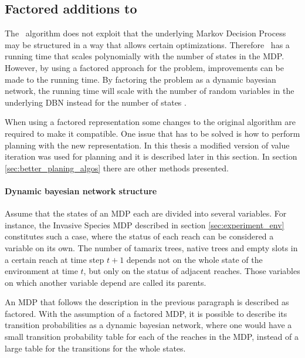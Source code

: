 \subsection{Factored additions to \etre}
\label{sec:factored_e3}

The \etre\ algorithm does not exploit that the underlying Markov Decision
Process may be structured in a way that allows certain optimizations. Therefore
\etre\ has a running time that scales polynomially with the number of states in
the MDP. However, by using a factored approach for the problem, improvements
can be made to the running time. By factoring the problem as a dynamic bayesian
network, the running time will scale with the number of random variables in the
underlying DBN instead for the number of states
\parencite{kearns1999efficient}. 

When using a factored representation some changes to the original algorithm are
required to make it compatible. One issue that has to be solved is how to
perform  planning with the new representation. In this thesis a modified version
of value iteration was used for planning and it is described later in this
section. In section \ref{sec:better_planing_algos} there are other methods
presented.


\paragraph{Dynamic bayesian network structure}

Assume that the states of an MDP each are divided into several variables. For
instance, the Invasive Species MDP described in section
\ref{sec:experiment_env} constitutes such a case, where the status of each
reach can be considered a variable on its own. The number of tamarix trees,
native trees and empty slots in a certain reach at time step $t+1$ depends not
on the whole state of the environment at time $t$, but only on the status of
adjacent reaches. Those variables on which another variable depend are called
its parents.  

An MDP that follows the description in the previous paragraph is described as
factored. With the assumption of a factored MDP, it is possible to describe its
transition probabilities as a dynamic bayesian network, where one would have a
small transition probability table for each of the reaches in the MDP, instead
of a large table for the transitions for the whole states.
